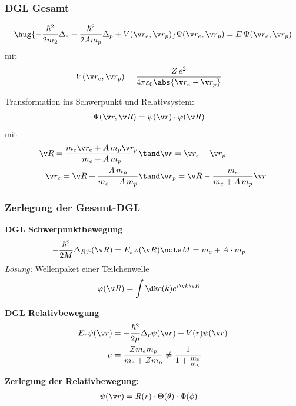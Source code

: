 \documentclass[twocolumn]{summery_4.1}
\begin{document}
\subsubsection{DGL Gesamt}
\begin{align*}
    \hug{-\frac{\hbar^2}{2m_2} \Delta_e - \frac{\hbar^2}{2A m_p}\Delta_p + V(\v r_e, \v r_p)} \Psi(\v r_e, \v r_p) = E \,\Psi(\v r_e, \v r_p)
\end{align*}
mit 
\begin{align*}
    V(\v r_e, \v r_p) &= \frac{Z\, e^2}{4\pi \varepsilon_0 \abs{\v r_e - \v r_p}}
\end{align*}

Transformation ins Schwerpunkt und Relativsystem:
\begin{align*}
    \Psi(\v r, \v R) &= \psi(\v r)\cdot \varphi(\v R)
\end{align*}
mit 
\begin{align*}
    \v R = \frac{m_e \v r_e + A\, m_p \v r_p}{m_e + A \, m_p}&\tand \v r= \v r_e - \v r_p\\
    \v r_e = \v R + \frac{A\, m_p}{m_e + A\, m_p} &\tand \v r_p = \v R - \frac{m_e}{m_e + A\, m_p} \v r
\end{align*}

\subsubsection{Zerlegung der Gesamt-DGL}
{\bf DGL Schwerpunktbewegung}
\begin{align*}
    -\frac{\hbar^2}{2M} \Delta_R \varphi(\v R) &= E_s \varphi(\v R)\note M = m_e +A\cdot m_p
\end{align*}
\textit{Lösung:} Wellenpaket einer Teilchenwelle
\begin{align*}
    \varphi(\v R) &= \int\dk c(k) e^{i\v k \v R}
\end{align*}

{\bf DGL Relativbewegung}
\begin{align*}
    E_r \psi(\v r) &= -\frac{\hbar^2}{2\mu} \Delta_r \psi(\v r) + V(r) \psi(\v r) \\
    \mu &= \frac{Z m_e m_p}{m_e + Z m_p}\neq \frac1{1+\frac{m_e}{m_k}}
\end{align*}

\textbf{Zerlegung der Relativbewegung:}
\begin{align*}
    \psi(\v r) &= R(r) \cdot \Theta(\theta) \cdot \Phi(\phi)
\end{align*}
\end{document}
